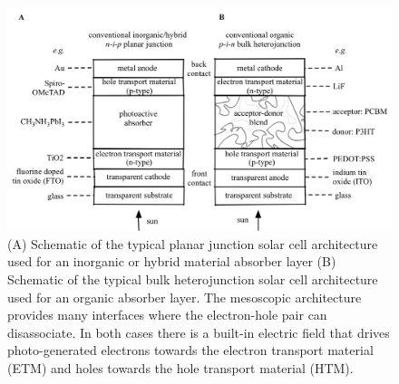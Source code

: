 \begin{figure}[h]
 \centering
   \includegraphics[width=1.0\columnwidth]{figures/ch1/PVarchitecture.png}
   \caption[Typical inorganic/hybrid and organic solar cell architectures]{(A) Schematic of the typical planar junction solar cell architecture used for an inorganic or hybrid material absorber layer (B) Schematic of the typical bulk heterojunction solar cell architecture used for an organic absorber layer. The mesoscopic architecture provides many interfaces where the electron-hole pair can disassociate.  In both cases there is a built-in electric field that drives photo-generated electrons towards the electron transport material (ETM) and holes towards the hole transport material (HTM).}
   \label{SC_architecture}
 \end{figure}




